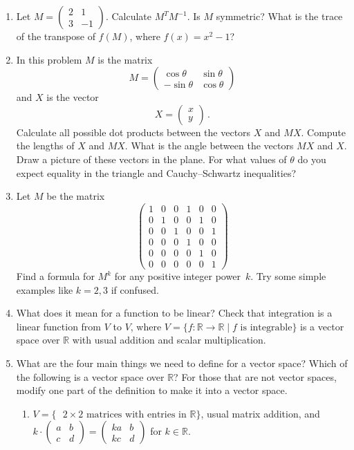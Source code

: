 \begin{enumerate}
\item Let $M = \left ( \begin{array}{cc} 2 & 1 \\ 3 & -1 \end{array}  \right )$.  Calculate $M^TM^{-1}$.  Is $M$ symmetric?  What is the trace of the transpose of $f(M)$, where $f(x) = x^2 -1$?

\item In this problem $M$ is the matrix
\[
M=\begin{pmatrix}\cos\theta & \sin\theta \\ -\sin\theta&\cos\theta\end{pmatrix}
\]
and $X$ is the vector
\[
X=\begin{pmatrix}x\\y \end{pmatrix}\, .
\]
Calculate all possible dot products between the vectors $X$ and $MX$. Compute the lengths of $X$ and $MX$.
What is the angle between the vectors $MX$ and $X$. Draw a picture of these vectors in the plane. For what values
of $\theta$ do you expect equality in the triangle and Cauchy--Schwartz inequalities?

\item Let $M$ be the matrix
\[
\begin{pmatrix}
1&0&0&1&0&0\\
0&1&0&0&1&0\\
0&0&1&0&0&1\\
0&0&0&1&0&0\\
0&0&0&0&1&0\\
0&0&0&0&0&1
\end{pmatrix}
\]
Find a formula for $M^k$ for any positive integer power~$k$. Try some simple examples like $k=2,3$ if confused.



\item What does it mean for a function to be linear?  Check that integration is a linear function from $V$ to $V$, where $V = \{ f: \mathbb{R} \to \mathbb{R} \mid f \textrm{ is integrable}\}$ is a vector space over $\mathbb{R}$ with usual addition and scalar multiplication.


\item What are the four main things we need to define for a vector space?  Which of the following is a vector space over $\mathbb{R}$?  For those that are not vector spaces, modify one part of the definition to make it into a vector space.
\begin{enumerate}
\item $V = \{ \textrm{ $2 \times 2$ matrices with entries in $\mathbb{R}$} \}$, usual matrix addition, and $k \cdot \left ( \begin{array}{cc} a & b \\ c & d \end{array}  \right ) = \left ( \begin{array}{cc} ka & b \\ kc & d \end{array}  \right )$ for $k \in \mathbb{R}$.


\end{enumerate}
\end{enumerate}

